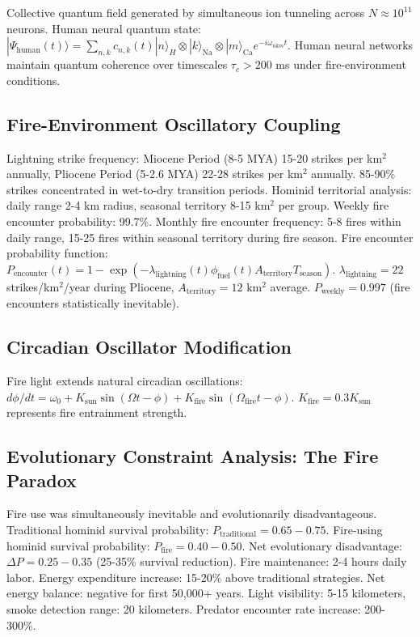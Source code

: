 \documentclass[12pt,a4paper]{article}
\begin{document}
Collective quantum field generated by simultaneous ion tunneling across $N \approx 10^{11}$ neurons. Human neural quantum state: $|\Psi_{\text{human}}(t)\rangle = \sum_{n,k} c_{n,k}(t) |n\rangle_H \otimes |k\rangle_{\text{Na}} \otimes |m\rangle_{\text{Ca}} e^{-i\omega_{nkm}t}$. Human neural networks maintain quantum coherence over timescales $\tau_c > 200$ ms under fire-environment conditions.

\subsection{Fire-Environment Oscillatory Coupling}

Lightning strike frequency: Miocene Period (8-5 MYA) 15-20 strikes per km$^2$ annually, Pliocene Period (5-2.6 MYA) 22-28 strikes per km$^2$ annually. 85-90\% strikes concentrated in wet-to-dry transition periods. Hominid territorial analysis: daily range 2-4 km radius, seasonal territory 8-15 km$^2$ per group. Weekly fire encounter probability: 99.7\%. Monthly fire encounter frequency: 5-8 fires within daily range, 15-25 fires within seasonal territory during fire season. Fire encounter probability function: $P_{\text{encounter}}(t) = 1 - \exp(-\lambda_{\text{lightning}}(t) \phi_{\text{fuel}}(t) A_{\text{territory}} T_{\text{season}})$. $\lambda_{\text{lightning}} = 22$ strikes/km$^2$/year during Pliocene, $A_{\text{territory}} = 12$ km$^2$ average. $P_{\text{weekly}} = 0.997$ (fire encounters statistically inevitable).

\subsection{Circadian Oscillator Modification}

Fire light extends natural circadian oscillations: $d\phi/dt = \omega_0 + K_{\text{sun}} \sin(\Omega t - \phi) + K_{\text{fire}} \sin(\Omega_{\text{fire}} t - \phi)$. $K_{\text{fire}} = 0.3 K_{\text{sun}}$ represents fire entrainment strength.

\subsection{Evolutionary Constraint Analysis: The Fire Paradox}

Fire use was simultaneously inevitable and evolutionarily disadvantageous. Traditional hominid survival probability: $P_{\text{traditional}} = 0.65-0.75$. Fire-using hominid survival probability: $P_{\text{fire}} = 0.40-0.50$. Net evolutionary disadvantage: $\Delta P = 0.25-0.35$ (25-35\% survival reduction). Fire maintenance: 2-4 hours daily labor. Energy expenditure increase: 15-20\% above traditional strategies. Net energy balance: negative for first 50,000+ years. Light visibility: 5-15 kilometers, smoke detection range: 20 kilometers. Predator encounter rate increase: 200-300\%.
\end{document}
